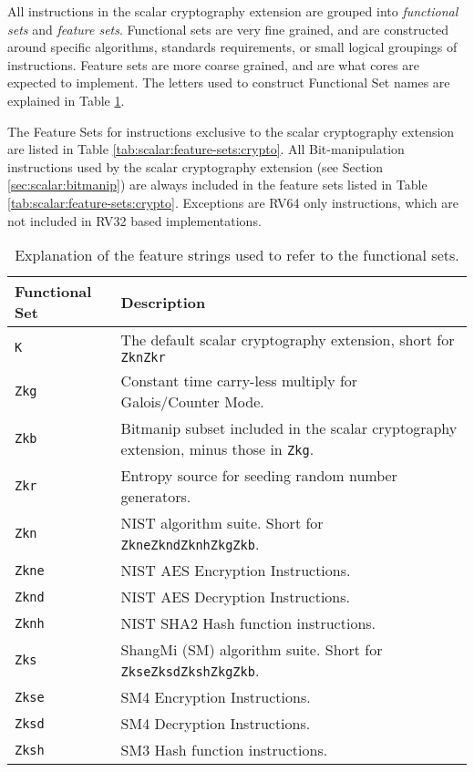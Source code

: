 
All instructions in the scalar cryptography extension are grouped into
{\em functional sets} and {\em feature sets}.
Functional sets are very fine grained, and are constructed around
specific algorithms, standards requirements, or small logical groupings
of instructions.
Feature sets are more coarse grained, and are what cores are expected
to implement.
The letters used to construct Functional Set names are explained in
Table \ref{tab:scalar:functional-sets}.

The Feature Sets for instructions exclusive to the scalar cryptography
extension are listed in
Table \ref{tab:scalar:feature-sets:crypto}.
All Bit-manipulation instructions used by the scalar cryptography extension
(see Section \ref{sec:scalar:bitmanip})
are always included in the feature sets listed in
Table \ref{tab:scalar:feature-sets:crypto}.
Exceptions are RV64 only instructions, which are not included in RV32
based implementations.

\begin{table}[h]
\centering
\begin{tabular}{l|l}
Functional Set    & Description \\
\hline
       {\tt  K   }& The default scalar cryptography extension, short for {\tt ZknZkr}   \\
       {\tt Zkg  }& Constant time carry-less multiply for Galois/Counter Mode.          \\
       {\tt Zkb  }& Bitmanip subset included in the scalar cryptography extension, minus those in {\tt Zkg}. \\
       {\tt Zkr  }& Entropy source for seeding random number generators.                \\
       {\tt Zkn  }& NIST algorithm suite. Short for {\tt ZkneZkndZknhZkgZkb}.           \\
       {\tt Zkne }& NIST AES Encryption Instructions.                                   \\
       {\tt Zknd }& NIST AES Decryption Instructions.                                   \\
       {\tt Zknh }& NIST SHA2 Hash function instructions.                               \\
       {\tt Zks  }& ShangMi (SM) algorithm suite. Short for {\tt ZkseZksdZkshZkgZkb}.   \\
       {\tt Zkse }& SM4 Encryption Instructions.                                        \\
       {\tt Zksd }& SM4 Decryption Instructions.                                        \\
       {\tt Zksh }& SM3 Hash function instructions.                                     \\
\hline
\end{tabular}
\caption{
    Explanation of the feature strings used to refer to the functional sets.
}
\label{tab:scalar:functional-sets}
\end{table}

